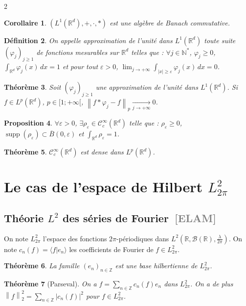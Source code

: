 \documentclass[10pt,a4paper]{article}
\theoremstyle{plan}
\newtheorem{theoreme}{Théorème}
\newtheorem{definition}[theoreme]{Définition}
\newtheorem{proposition}[theoreme]{Proposition}
\newtheorem{corollaire}[theoreme]{Corollaire}
\theoremstyle{planex}   %
\newcommand{\srcs}[1]{\ {\normalfont\small\textcolor{gray}{[#1]}}}
\newcommand{\R}{\mathbb{R}}
\newcommand{\N}{\mathbb{N}}
\newcommand{\Z}{\mathbb{Z}}
\newcommand{\Cc}{\mathcal{C}}
\newcommand{\Bb}{\mathcal{B}}
\newcommand{\norm}[1]{\left\lVert #1\right\rVert}
\newcommand{\abs}[1]{\left\lvert #1\right\rvert}
\begin{document}
\begin{multicols}{2}
\begin{corollaire}
$(L^1(\R^d), +, \cdot, *)$ est une algèbre de Banach commutative.
\end{corollaire}

\begin{definition}
On appelle approximation de l'unité dans $L^1(\R^d)$ toute suite $(\varphi_j)_{j \ge 1}$ de fonctions mesurables sur $\R^d$ telles que : $\forall j \in \N^*$, $\varphi_j \ge 0$, $\int_{\R^d} \varphi_j(x)\,dx = 1$ et pour tout $\varepsilon > 0$, $\lim_{j \to +\infty} \int_{\abs{x} \ge \varepsilon} \varphi_j(x)\,dx = 0$.
\end{definition}

\begin{theoreme}
Soit $(\varphi_j)_{j \ge 1}$ une approximation de l'unité dans $L^1(\R^d)$. Si $f \in L^p(\R^d)$, $p \in [1;+\infty[$, $\norm{f * \varphi_j - f}_p \xrightarrow[j \to +\infty]{} 0$.
\end{theoreme}

\begin{proposition}
$\forall \varepsilon > 0$, $\exists \rho_\varepsilon \in \Cc_c^\infty(\R^d)$ telle que : $\rho_\varepsilon \ge 0$, $\operatorname{supp}(\rho_\varepsilon) \subset \overline{B}(0,\varepsilon)$ et $\int_{\R^d} \rho_\varepsilon = 1$.
\end{proposition}

\begin{theoreme}
$\Cc_c^\infty(\R^d)$ est dense dans $L^p(\R^d)$.
\end{theoreme}

\section{Le cas de l'espace de Hilbert $L^2_{2\pi}$}

\subsection{Théorie $L^2$ des séries de Fourier\srcs{ELAM}}
On note $L^2_{2\pi}$ l'espace des fonctions $2\pi$-périodiques dans $L^2(\R, \Bb(\R), \frac{\lambda}{2\pi})$. On note $c_n(f) = \langle f | e_n \rangle$ les coefficients de Fourier de $f \in L^2_{2\pi}$.

\begin{theoreme}
La famille $(e_n)_{n \in \Z}$ est une base hilbertienne de $L^2_{2\pi}$.
\end{theoreme}

\begin{theoreme}[Parseval]
On a $f = \sum_{n \in \Z} c_n(f) e_n$ dans $L^2_{2\pi}$. On a de plus $\norm{f}_2^2 = \sum_{n \in \Z} \abs{c_n(f)}^2$ pour $f \in L^2_{2\pi}$.
\end{theoreme}


\end{multicols}
\end{document}
